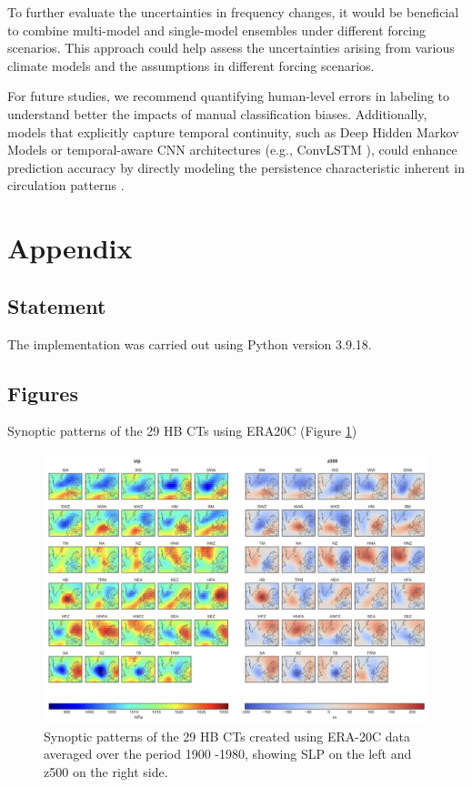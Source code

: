 \documentclass[
]{krantz}
\begin{document}
To further evaluate the uncertainties in frequency changes, it would be beneficial to combine multi-model and single-model ensembles under different forcing scenarios. This approach could help assess the uncertainties arising from various climate models and the assumptions in different forcing scenarios.

For future studies, we recommend quantifying human-level errors in labeling to understand better the impacts of manual classification biases.
Additionally, models that explicitly capture temporal continuity, such as Deep Hidden Markov Models \citep{Yu2015} or temporal-aware CNN architectures (e.g., ConvLSTM \citep{Moishin2021}),
could enhance prediction accuracy by directly modeling the persistence characteristic inherent in circulation patterns \citep{Mittermeier2022}.

\section{Appendix}\label{appendix}

\subsection{Statement}\label{statement}

The implementation was carried out using Python version 3.9.18.

\subsection{Figures}\label{figures}

Synoptic patterns of the 29 HB CTs using ERA20C (Figure \ref{fig:ERA20C}) \citep{Mittermeier2022}

\begin{figure}

{\centering \includegraphics[width=0.7\linewidth]{work/01-weatherpattern/figures/paper/circulation_types} 

}

\caption{Synoptic patterns of the 29 HB CTs created using ERA-20C data averaged over the period 1900 -1980, showing SLP on the left and z500 on the right side.}\label{fig:ERA20C}
\end{figure}
\end{document}
